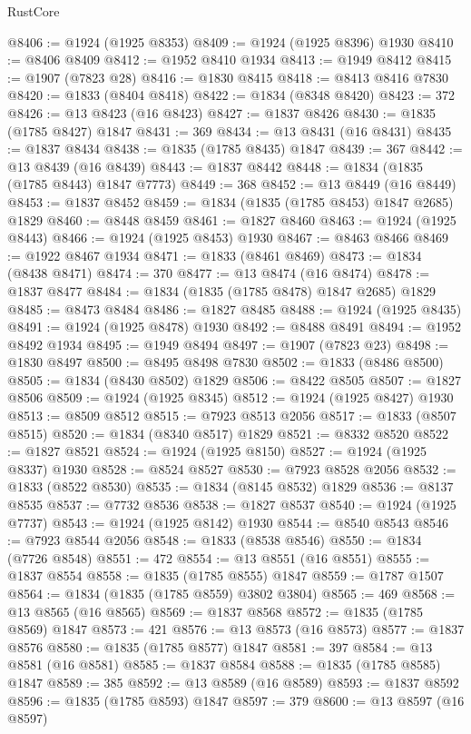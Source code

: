 \begin{lexlean}{RustCore}
\begin{coremodule}
@8406 := @1924 (@1925 @8353)
@8409 := @1924 (@1925 @8396) @1930
@8410 := @8406 @8409
@8412 := @1952 @8410 @1934
@8413 := @1949 @8412
@8415 := @1907 (@7823 @28)
@8416 := @1830 @8415
@8418 := @8413 @8416 @7830
@8420 := @1833 (@8404 @8418)
@8422 := @1834 (@8348 @8420)
@8423 := 372
@8426 := @13 @8423 (@16 @8423)
@8427 := @1837 @8426
@8430 := @1835 (@1785 @8427) @1847
@8431 := 369
@8434 := @13 @8431 (@16 @8431)
@8435 := @1837 @8434
@8438 := @1835 (@1785 @8435) @1847
@8439 := 367
@8442 := @13 @8439 (@16 @8439)
@8443 := @1837 @8442
@8448 := @1834 (@1835 (@1785 @8443) @1847 @7773)
@8449 := 368
@8452 := @13 @8449 (@16 @8449)
@8453 := @1837 @8452
@8459 := @1834 (@1835 (@1785 @8453) @1847 @2685) @1829
@8460 := @8448 @8459
@8461 := @1827 @8460
@8463 := @1924 (@1925 @8443)
@8466 := @1924 (@1925 @8453) @1930
@8467 := @8463 @8466
@8469 := @1922 @8467 @1934
@8471 := @1833 (@8461 @8469)
@8473 := @1834 (@8438 @8471)
@8474 := 370
@8477 := @13 @8474 (@16 @8474)
@8478 := @1837 @8477
@8484 := @1834 (@1835 (@1785 @8478) @1847 @2685) @1829
@8485 := @8473 @8484
@8486 := @1827 @8485
@8488 := @1924 (@1925 @8435)
@8491 := @1924 (@1925 @8478) @1930
@8492 := @8488 @8491
@8494 := @1952 @8492 @1934
@8495 := @1949 @8494
@8497 := @1907 (@7823 @23)
@8498 := @1830 @8497
@8500 := @8495 @8498 @7830
@8502 := @1833 (@8486 @8500)
@8505 := @1834 (@8430 @8502) @1829
@8506 := @8422 @8505
@8507 := @1827 @8506
@8509 := @1924 (@1925 @8345)
@8512 := @1924 (@1925 @8427) @1930
@8513 := @8509 @8512
@8515 := @7923 @8513 @2056
@8517 := @1833 (@8507 @8515)
@8520 := @1834 (@8340 @8517) @1829
@8521 := @8332 @8520
@8522 := @1827 @8521
@8524 := @1924 (@1925 @8150)
@8527 := @1924 (@1925 @8337) @1930
@8528 := @8524 @8527
@8530 := @7923 @8528 @2056
@8532 := @1833 (@8522 @8530)
@8535 := @1834 (@8145 @8532) @1829
@8536 := @8137 @8535
@8537 := @7732 @8536
@8538 := @1827 @8537
@8540 := @1924 (@1925 @7737)
@8543 := @1924 (@1925 @8142) @1930
@8544 := @8540 @8543
@8546 := @7923 @8544 @2056
@8548 := @1833 (@8538 @8546)
@8550 := @1834 (@7726 @8548)
@8551 := 472
@8554 := @13 @8551 (@16 @8551)
@8555 := @1837 @8554
@8558 := @1835 (@1785 @8555) @1847
@8559 := @1787 @1507
@8564 := @1834 (@1835 (@1785 @8559) @3802 @3804)
@8565 := 469
@8568 := @13 @8565 (@16 @8565)
@8569 := @1837 @8568
@8572 := @1835 (@1785 @8569) @1847
@8573 := 421
@8576 := @13 @8573 (@16 @8573)
@8577 := @1837 @8576
@8580 := @1835 (@1785 @8577) @1847
@8581 := 397
@8584 := @13 @8581 (@16 @8581)
@8585 := @1837 @8584
@8588 := @1835 (@1785 @8585) @1847
@8589 := 385
@8592 := @13 @8589 (@16 @8589)
@8593 := @1837 @8592
@8596 := @1835 (@1785 @8593) @1847
@8597 := 379
@8600 := @13 @8597 (@16 @8597)

\end{coremodule}
\end{lexlean}
